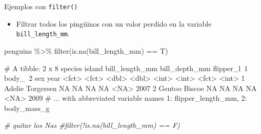 \documentclass[
  ignorenonframetext,
  aspectratio=169]{beamer}
\newenvironment{Shaded}{\begin{snugshade}}{\end{snugshade}}
\newcommand{\CommentTok}[1]{\textcolor[rgb]{0.56,0.35,0.01}{\textit{#1}}}
\newcommand{\FunctionTok}[1]{\textcolor[rgb]{0.00,0.00,0.00}{#1}}
\newcommand{\NormalTok}[1]{#1}
\newcommand{\SpecialCharTok}[1]{\textcolor[rgb]{0.00,0.00,0.00}{#1}}
\providecommand{\tightlist}{%
  \setlength{\itemsep}{0pt}\setlength{\parskip}{0pt}}
\let\oldverbatim\verbatim
\let\endoldverbatim\endverbatim
\renewenvironment{verbatim}{\tiny\oldverbatim}{\endoldverbatim}
\begin{document}
\begin{frame}[fragile]{Ejemplos con \texttt{filter()}}
\protect\hypertarget{ejemplos-con-filter-1}{}
\begin{itemize}
\tightlist
\item
  Filtrar todos los pingüinos con un valor perdido en la variable
  \texttt{bill\_length\_mm}.\\
\end{itemize}

\begin{Shaded}
\begin{Highlighting}[]
\NormalTok{penguins }\SpecialCharTok{\%\textgreater{}\%} 
  \FunctionTok{filter}\NormalTok{(}\FunctionTok{is.na}\NormalTok{(bill\_length\_mm) }\SpecialCharTok{==}\NormalTok{ T)}
\end{Highlighting}
\end{Shaded}

\begin{verbatim}
# A tibble: 2 x 8
  species island    bill_length_mm bill_depth_mm flipper_l~1 body_~2 sex    year
  <fct>   <fct>              <dbl>         <dbl>       <int>   <int> <fct> <int>
1 Adelie  Torgersen             NA            NA          NA      NA <NA>   2007
2 Gentoo  Biscoe                NA            NA          NA      NA <NA>   2009
# ... with abbreviated variable names 1: flipper_length_mm, 2: body_mass_g
\end{verbatim}

\begin{Shaded}
\begin{Highlighting}[]
  \CommentTok{\# quitar los Nas}
  \CommentTok{\#filter(!is.na(bill\_length\_mm) == F)}
\end{Highlighting}
\end{Shaded}
\end{frame}
\end{document}
